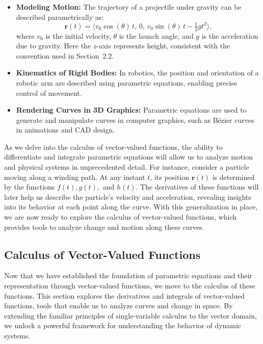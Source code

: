 \begin{itemize}
    \item \textbf{Modeling Motion:} The trajectory of a projectile under gravity can be described parametrically as:
    \[
    \mathbf{r}(t) = \langle v_0 \cos(\theta) \, t, \, 0, \, v_0 \sin(\theta) \, t - \tfrac{1}{2} g t^2 \rangle,
    \]
    where \( v_0 \) is the initial velocity, \( \theta \) is the launch angle, and \( g \) is the acceleration due to gravity. Here the \( z \)-axis represents height, consistent with the convention used in Section~2.2.

    \item \textbf{Kinematics of Rigid Bodies:} In robotics, the position and orientation of a robotic arm are described using parametric equations, enabling precise control of movement.

    \item \textbf{Rendering Curves in 3D Graphics:} Parametric equations are used to generate and manipulate curves in computer graphics, such as Bézier curves in animations and CAD design.
\end{itemize}

\noindent As we delve into the calculus of vector-valued functions, the ability to differentiate and integrate parametric equations will allow us to analyze motion and physical systems in unprecedented detail. For instance, consider a particle moving along a winding path. At any instant \( t \), its position \( \mathbf{r}(t) \) is determined by the functions \( f(t), g(t), \) and \( h(t) \). The derivatives of these functions will later help us describe the particle’s velocity and acceleration, revealing insights into its behavior at each point along the curve. With this generalization in place, we are now ready to explore the calculus of vector-valued functions, which provides tools to analyze change and motion along these curves.



\subsection*{Calculus of Vector-Valued Functions}  

\noindent Now that we have established the foundation of parametric equations and their representation through vector-valued functions, we move to the calculus of these functions. This section explores the derivatives and integrals of vector-valued functions, tools that enable us to analyze curves and change in space. By extending the familiar principles of single-variable calculus to the vector domain, we unlock a powerful framework for understanding the behavior of dynamic systems.

